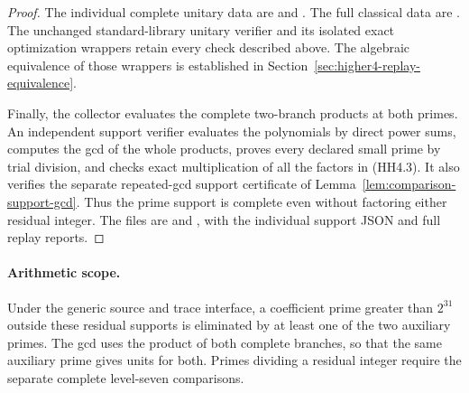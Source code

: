 \begin{proof}
The individual complete unitary data are
and .
The full classical data are
.
The unchanged standard-library unitary verifier and its isolated
exact optimization wrappers retain every check described above.
The algebraic equivalence of those wrappers is established in
Section~\ref{sec:higher4-replay-equivalence}.

Finally, the collector evaluates the complete two-branch products
at both primes. An independent support verifier evaluates the
polynomials by direct power sums, computes the gcd of the whole
products, proves every declared small prime by trial division,
and checks exact multiplication of all the factors in (HH4.3).
It also verifies the separate repeated-gcd support certificate of
Lemma~\ref{lem:comparison-support-gcd}. Thus the prime support is
complete even without factoring either residual integer. The
files are  and
, with the
individual support JSON and full replay reports.
\end{proof}

\paragraph{Arithmetic scope.}
Under the generic source and trace interface, a coefficient prime
greater than \(2^{31}\) outside these residual supports is
eliminated by at least one of the two auxiliary primes. The gcd
uses the product of both complete branches, so that the same
auxiliary prime gives units for both. Primes dividing a residual
integer require the separate complete level-seven comparisons.
